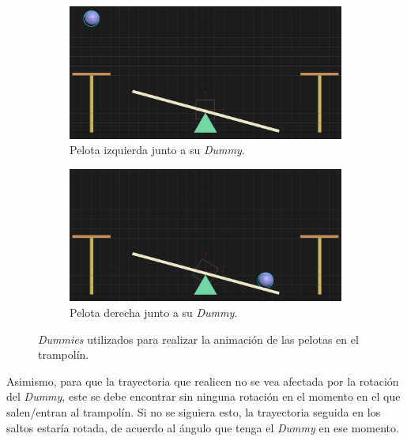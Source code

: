 \begin{figure}[H]
    \centering 
	\begin{subfigure}[t]{0.48\textwidth}
	    \centering
	    \includegraphics[width=\textwidth]{imagenes/misc/PLDummy.png}
   \caption{Pelota izquierda junto a su \textit{Dummy}.}
    \end{subfigure}
    \hfill
	\begin{subfigure}[t]{0.48\textwidth}
	    \centering
       \includegraphics[width=\textwidth]{imagenes/misc/PRDummy.png}
   \caption{Pelota derecha junto a su \textit{Dummy}.}
    \end{subfigure}    
    \caption{\textit{Dummies} utilizados para realizar la animación de las pelotas en el trampolín.}
\end{figure}




\bigskip

Asimismo, para que la trayectoria que realicen no se vea afectada por la rotación del \textit{Dummy}, este se debe encontrar sin ninguna rotación en el momento en el que salen/entran al trampolín. Si no se siguiera esto, la trayectoria seguida en los saltos estaría rotada, de acuerdo al ángulo que tenga el \textit{Dummy} en ese momento.

